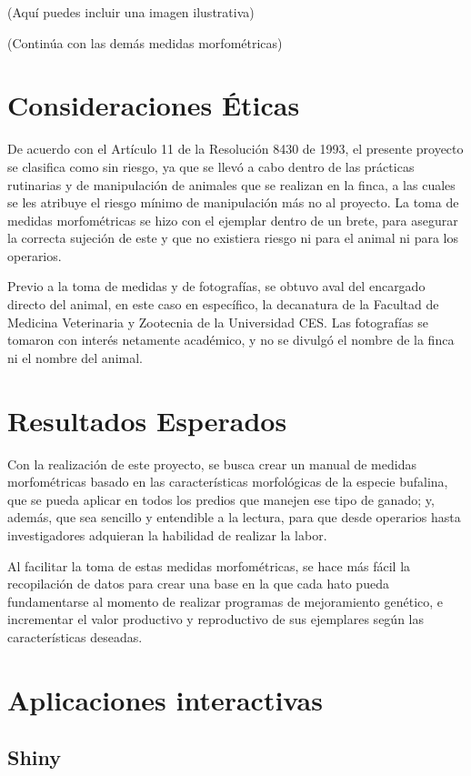 \documentclass[
]{book}
\begin{document}
(Aquí puedes incluir una imagen ilustrativa)

(Continúa con las demás medidas morfométricas)

\chapter{Consideraciones Éticas}\label{consideraciones-uxe9ticas}

De acuerdo con el Artículo 11 de la Resolución 8430 de 1993, el presente proyecto se clasifica como sin riesgo, ya que se llevó a cabo dentro de las prácticas rutinarias y de manipulación de animales que se realizan en la finca, a las cuales se les atribuye el riesgo mínimo de manipulación más no al proyecto. La toma de medidas morfométricas se hizo con el ejemplar dentro de un brete, para asegurar la correcta sujeción de este y que no existiera riesgo ni para el animal ni para los operarios.

Previo a la toma de medidas y de fotografías, se obtuvo aval del encargado directo del animal, en este caso en específico, la decanatura de la Facultad de Medicina Veterinaria y Zootecnia de la Universidad CES. Las fotografías se tomaron con interés netamente académico, y no se divulgó el nombre de la finca ni el nombre del animal.

\chapter{Resultados Esperados}\label{resultados-esperados}

Con la realización de este proyecto, se busca crear un manual de medidas morfométricas basado en las características morfológicas de la especie bufalina, que se pueda aplicar en todos los predios que manejen ese tipo de ganado; y, además, que sea sencillo y entendible a la lectura, para que desde operarios hasta investigadores adquieran la habilidad de realizar la labor.

Al facilitar la toma de estas medidas morfométricas, se hace más fácil la recopilación de datos para crear una base en la que cada hato pueda fundamentarse al momento de realizar programas de mejoramiento genético, e incrementar el valor productivo y reproductivo de sus ejemplares según las características deseadas.

\chapter{Aplicaciones interactivas}\label{aplicaciones-interactivas}

\section{Shiny}\label{shiny}

  
\end{document}

